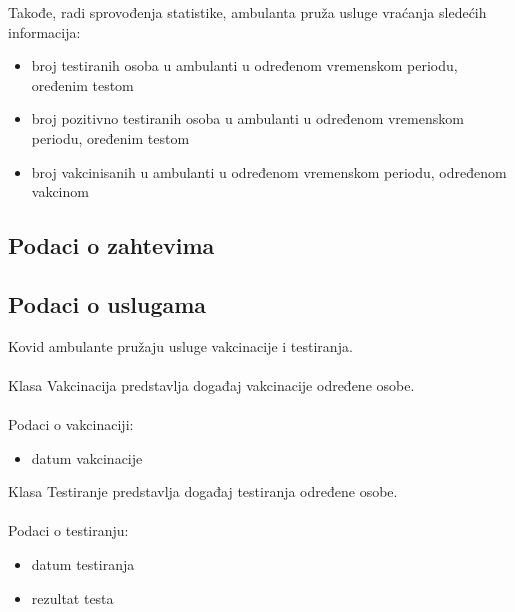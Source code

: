 \documentclass[titlepage]{article}
\begin{document}
Takođe, radi sprovođenja statistike, ambulanta pruža usluge vraćanja sledećih informacija:

\begin{itemize}
    \item broj testiranih osoba u ambulanti u određenom vremenskom periodu, oređenim testom
    \item broj pozitivno testiranih osoba u ambulanti u određenom vremenskom periodu, oređenim testom
    \item broj vakcinisanih u ambulanti u određenom vremenskom periodu, određenom vakcinom
\end{itemize}

\subsection{Podaci o zahtevima}

\subsection{Podaci o uslugama}
Kovid ambulante pružaju usluge vakcinacije i testiranja. \\ \\ 
Klasa Vakcinacija predstavlja događaj vakcinacije određene osobe. \\ \\
Podaci o vakcinaciji:
\begin{itemize}
    \item datum vakcinacije
\end{itemize}
Klasa Testiranje predstavlja događaj testiranja određene osobe. \\ \\
Podaci o testiranju:
\begin{itemize}
    \item datum testiranja
    \item rezultat testa
\end{itemize}
\end{document}
